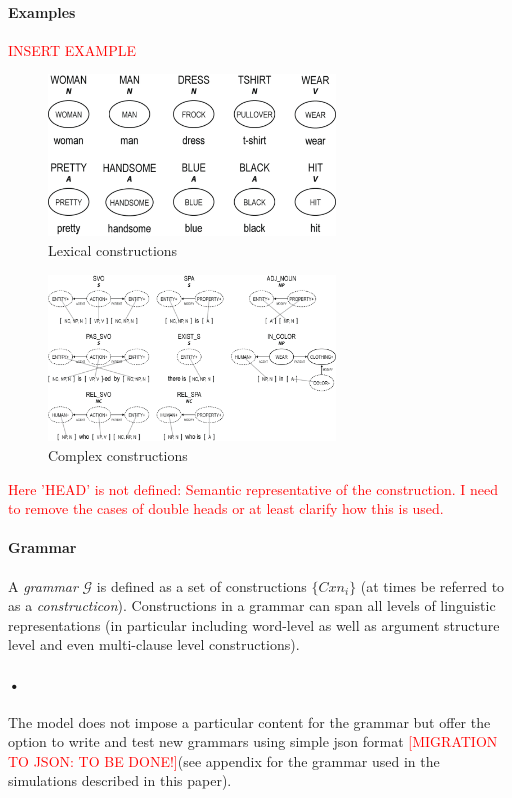 \documentclass{article}
\newcommand\todo[1]{\textcolor{red}{#1}}
\begin{document}
\paragraph{Examples}
\todo{INSERT EXAMPLE}

\begin{figure}[H]
	\centering
	\includegraphics[width=3.0in]{Figures/constructions-01.png}
	\caption{Lexical constructions}
	\label{fig:lex_cxn_ex}
\end{figure}

\begin{figure}[H]
	\centering
	\includegraphics[width=3.0in]{Figures/constructions-02.png}
	\caption{Complex constructions}
	\label{fig:comp_cxm_ex}
\end{figure}

\todo{Here 'HEAD' is not defined: Semantic representative of the construction. I need to remove the cases of double heads or at least clarify how this is used.}

\paragraph{Grammar}
A \emph{grammar} $\mathcal{G}$ is defined as a set of constructions $ \lbrace Cxn_i \rbrace$ (at times be referred to as a \emph{constructicon}). Constructions in a grammar can span all levels of linguistic representations (in particular including word-level as well as argument structure level and even multi-clause level constructions).

\paragraph{•}
The model does not impose a particular content for the grammar but offer the option to write and test new grammars using simple json format \todo{[MIGRATION TO JSON: TO BE DONE!]}(see appendix for the grammar used in the simulations described in this paper).
\end{document}
